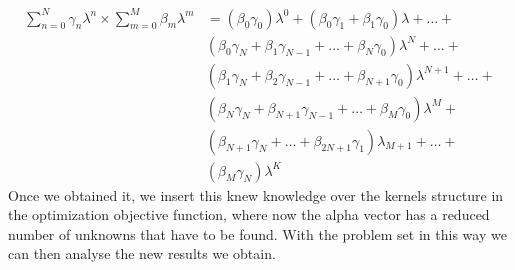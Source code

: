 \begin{equation}
\begin{split}
\sum_{n=0}^N\gamma_n \lambda^n \times \sum_{m=0}^M \beta_m \lambda^m &= (\beta_0 \gamma_0)\lambda^0 + (\beta_0 \gamma_1 + \beta_1 \gamma_0)\lambda + \dots + \\
&(\beta_0 \gamma_N + \beta_1 \gamma_{N-1} + \dots + \beta_N \gamma_0)\lambda^N + \dots + \\
&(\beta_1 \gamma_N + \beta_2 \gamma_{N-1} + \dots + \beta_{N+1} \gamma_0)\lambda^{N+1} + \dots +\\
&(\beta_{N} \gamma_{N} + \beta_{N+1} \gamma_{N-1} + \dots + \beta_{M} \gamma_0)\lambda^{M} + \\
&(\beta_{N+1} \gamma_{N} + \dots + \beta_{2N + 1} \gamma_1)\lambda_{M+1} + \dots +\\
&(\beta_M \gamma_N)\lambda^{K}
\end{split}
\label{eq:sviluppo}
\end{equation}
Once we obtained it, we insert this knew knowledge over the kernels structure in the optimization objective function, where now the alpha vector has a reduced number of unknowns that have to be found. With the problem set in this way we can then analyse the new results we obtain. 

